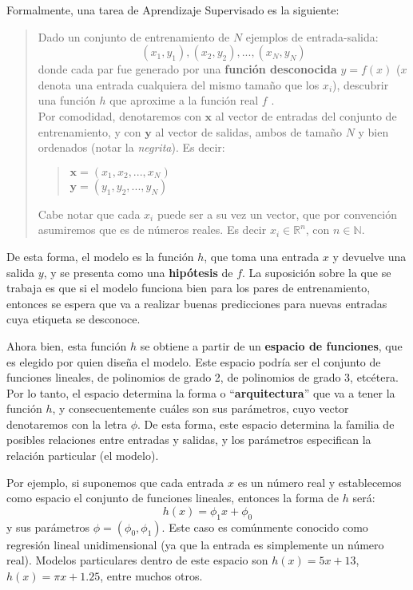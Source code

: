 \documentclass[../../main.tex]{subfiles}
\begin{document}
Formalmente, una tarea de Aprendizaje Supervisado es la siguiente:
\begin{quote}
    Dado un conjunto de entrenamiento de \(N\) ejemplos de entrada-salida:
    \[(x_1, y_1), (x_2, y_2), ..., (x_N, y_N)\] donde cada par fue generado por una
    \textbf{función desconocida} \(y=f(x)\) (\(x\) denota una entrada cualquiera del mismo
    tamaño que los \(x_i\)), descubrir una función \(h\) que aproxime a la función real
    \(f\) \cite{ai-a-modern-approach}.\\
    Por comodidad, denotaremos con \(\mathbf{x}\) al vector de entradas del conjunto de
    entrenamiento, y con \(\mathbf{y}\) al vector de salidas, ambos de tamaño \(N\) y bien
    ordenados (notar la \textit{negrita}). Es decir:
    \begin{quote}
        \(\mathbf{x}=(x_1, x_2, ..., x_N)\)\\
        \(\mathbf{y}=(y_1, y_2, ..., y_N)\)
    \end{quote}
    Cabe notar que cada \(x_i\) puede ser a su vez un vector, que por convención
    asumiremos que es de números reales. Es decir \(x_i \in \mathbb{R}^n\), con \(n \in
    \mathbb{N}\).
\end{quote}
De esta forma, el modelo es la función \(h\), que toma una entrada \(x\) y devuelve una
salida \(y\), y se presenta como una \textbf{hipótesis} de \(f\). La suposición sobre la
que se trabaja es que si el modelo funciona bien para los pares de entrenamiento, entonces
se espera que va a realizar buenas predicciones para nuevas entradas cuya etiqueta se
desconoce.

Ahora bien, esta función \(h\) se obtiene a partir de un \textbf{espacio de funciones},
que es elegido por quien diseña el modelo. Este espacio podría ser el conjunto de
funciones lineales, de polinomios de grado 2, de polinomios de grado 3, etcétera. Por lo
tanto, el espacio determina la forma o ``\textbf{arquitectura}'' que va a tener la función
\(h\), y consecuentemente cuáles son sus parámetros, cuyo vector denotaremos con la letra
\(\phi\). De esta forma, este espacio determina la familia de posibles relaciones entre
entradas y salidas, y los parámetros especifican la relación particular (el modelo).

Por ejemplo, si suponemos que cada entrada \(x\) es un número real y establecemos como
espacio el conjunto de funciones lineales, entonces la forma de \(h\) será:
\[h(x) = \phi_1 x + \phi_0\] y sus parámetros \(\phi=(\phi_0, \phi_1)\). Este caso es
comúnmente conocido como regresión lineal unidimensional (ya que la entrada es simplemente
un número real). Modelos particulares dentro de este espacio son \(h(x) = 5x + 13\),
\(h(x) = \pi x + 1.25\), entre muchos otros.
\end{document}
